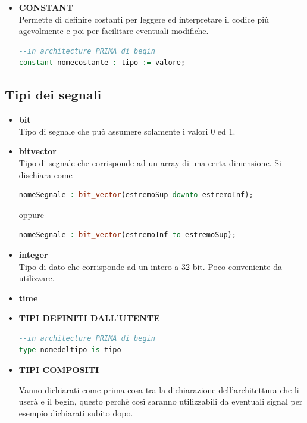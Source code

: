 \documentclass[a4paper]{book}
\begin{document}
\begin{itemize}
\item\textbf{CONSTANT}\\
Permette di definire costanti per leggere ed interpretare il codice più agevolmente e poi per facilitare eventuali modifiche.

\begin{lstlisting}[language=VHDL]
--in architecture PRIMA di begin
constant nomecostante : tipo := valore;
\end{lstlisting}
\end{itemize}


\subsection{Tipi dei segnali}

\begin{itemize}

\item\textbf{bit}\\
Tipo di segnale che può assumere solamente i valori 0 ed 1.
\item\textbf{bit\textunderscore vector}\\
Tipo di segnale che corrisponde ad un array di una certa dimensione.
Si dischiara come 
\begin{lstlisting}[language=VHDL]
nomeSegnale : bit_vector(estremoSup downto estremoInf);
\end{lstlisting}
oppure
\begin{lstlisting}[language=VHDL]
nomeSegnale : bit_vector(estremoInf to estremoSup);
\end{lstlisting}
\item\textbf{integer}\\
Tipo di dato che corrisponde ad un intero a 32 bit. Poco conveniente da utilizzare.
\item\textbf{time}\\

\item\textbf{TIPI DEFINITI DALL'UTENTE}

\begin{lstlisting}[language=VHDL]
--in architecture PRIMA di begin
type nomedeltipo is tipo
\end{lstlisting}

\item\textbf{TIPI COMPOSITI}

Vanno dichiarati come prima cosa tra la dichiarazione dell'architettura che li userà e il begin, questo perchè così saranno utilizzabili da eventuali signal per esempio dichiarati subito dopo.


\end{itemize}
\end{document}
